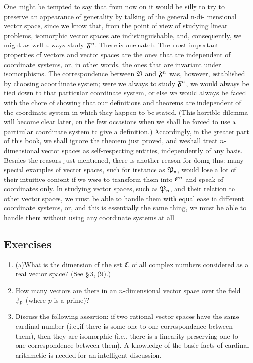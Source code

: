 One might be tempted to say that from now on it would be silly to try to
preserve an appearance of generality by talking of the general n-di- mensional
vector space, since we know that, from the point of view of studying linear
problems, isomorphic vector spaces are indistinguishable, and, consequently, we
might as well always study \(\mathfrak{F}^n\). There is one catch. The most important
properties of vectors and vector spaces are the ones that are independent of
coordinate systems, or, in other words, the ones that are invariant under
isomorphisms. The correspondence between \(\mathfrak{V}\) and \(\mathfrak{F}^n\) was,
however, established by choosing acoordinate system; were we always to study
\(\mathfrak{F}^n\), we would always be tied down to that particular coordinate system,
or else we would always be faced with the chore of showing that our definitions
and theorems are independent of the coordinate system in which they happen to be
stated. (This horrible dilemma will become clear later, on the few occasions
when we shall be forced to use a particular coordinate system to give a
definition.) Accordingly, in the greater part of this book, we shall ignore the
theorem just proved, and weshall treat \(n\)-dimensional vector spaces as
self-respecting entities, independently of any basis. Besides the reasons just
mentioned, there is another reason for doing this: many special examples of
vector spaces, such for instance as \(\mathfrak{P}_n\), would lose a lot of their
intuitive content if we were to transform them into \(\mathfrak{C}^n\) and speak of
coordinates only. In studying vector spaces, such as \(\mathfrak{P}_n\), and their
relation to other vector spaces, we must be able to handle them with equal ease
in different coordinate systems, or, and this is essentially the same thing, we
must be able to handle them without using any coordinate systems at all.

{\small
\subsection*{Exercises}

\begin{enumerate}[wide]
    \item (a)What is the dimension of the set \(\mathfrak{C}\) of all complex numbers considered as a real vector space? (See \S\,3, (9).)
    
    \item How many vectors are there in an \(n\)-dimensional vector space over
    the field \(\mathfrak{Z}_p\) (where \(p\) is a prime)?
    
    \item Discuss the following assertion: if two rational vector spaces have
    the same cardinal number (i.e.,if there is some one-to-one correspondence
    between them), then they are isomorphic (i.e., there is a
    linearity-preserving one-to-one correspondence between them). A knowledge of
    the basic facts of cardinal arithmetic is needed for an intelligent
    discussion.
\end{enumerate}

}

